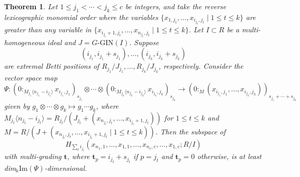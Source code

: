 \documentclass[a4paper, 10pt, reqno, english, ones]{amsart}  %
\newtheorem{theorem}{Theorem}[section]
\theoremstyle{definition}
\theoremstyle{remark}
\begin{document}
\begin{theorem}\label{thm:Koszul containment}
    Let $1\leq j_1 <\cdots < j_k\leq c$ be integers, and take the reverse lexicographic monomial order where the variables $\{x_{1,{j_t}},\dots,x_{i_{j_t},{j_t}} \mid 1\leq t \leq k\}$ are greater than any variable in $\{x_{i_{j_t}+1,{j_t}},\dots,x_{n_{j_t},{j_t}} \mid 1\leq t \leq k\}$.
    Let $I\subset R$ be a multi-homogeneous ideal and $J=G\textrm{-GIN}(I)$. Suppose $$({i_{j_1},i_{j_1}+s_{j_1}}),\dots,({i_{j_k},i_{j_k}+s_{j_k}})$$ are extremal Betti positions of $R_{j_1}/J_{j_1},\dots,R_{j_k}/J_{j_k}$, respectively. Consider the vector space map
    \[
    \Psi:(0:_{M_{j_1}\langle n_{j_1}-i_{j_1} \rangle}x_{i_{j_1},j_1})_{s_{j_1}}\otimes \cdots \otimes (0:_{M_{j_k}\langle n_{j_k}-i_{j_k} \rangle }x_{i_{j_k},j_k})_{s_{j_k}} \longrightarrow (0:_{M} (x_{i_{j_1},j_1},\dots,x_{i_{j_k},j_k}))_{s_{j_1}+\cdots +s_{j_k}}
    \]
    given by $g_1 \otimes \cdots \otimes g_k \mapsto g_1\cdots g_k$, where $M_{j_t}\langle n_{j_t}-i_{j_t} \rangle=R_{j_t}/(J_{j_t} + (x_{n_{j_t},j_t},\dots,x_{i_{j_t}+1,j_t}))$ for $1\leq t\leq k$ and $M=R/(J+(x_{n_{j_t},j_t},\dots,x_{i_{j_t}+1,j_t}\mid 1\leq t\leq k))$. Then the subspace of 
    $$
    H_{\sum_t i_{j_t}}(x_{n_1,1},\dots,x_{1,1},\dots,x_{n_c,c},\dots,x_{1,c};R/I)
    $$
    with multi-grading $\mathbf{t}$, where $\mathbf{t}_p=i_{j_t}+s_{j_t}$ if $p=j_t$ and  $\mathbf{t}_p=0$ otherwise, is at least dim$_\Bbbk\textrm{Im}(\Psi)$-dimensional.
\end{theorem}
\end{document}
